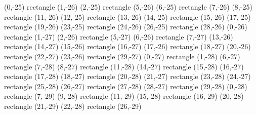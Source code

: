 {  (0,-25) rectangle (1,-26) (2,-25) rectangle (5,-26) (6,-25) rectangle (7,-26) (8,-25) rectangle (11,-26) (12,-25) rectangle (13,-26) (14,-25) rectangle (15,-26) (17,-25) rectangle (19,-26) (23,-25) rectangle (24,-26) (26,-25) rectangle (28,-26)%
  (0,-26) rectangle (1,-27) (2,-26) rectangle (5,-27) (6,-26) rectangle (7,-27) (13,-26) rectangle (14,-27) (15,-26) rectangle (16,-27) (17,-26) rectangle (18,-27) (20,-26) rectangle (22,-27) (23,-26) rectangle (29,-27)%
  (0,-27) rectangle (1,-28) (6,-27) rectangle (7,-28) (8,-27) rectangle (11,-28) (14,-27) rectangle (15,-28) (16,-27) rectangle (17,-28) (18,-27) rectangle (20,-28) (21,-27) rectangle (23,-28) (24,-27) rectangle (25,-28) (26,-27) rectangle (27,-28) (28,-27) rectangle (29,-28)%
  (0,-28) rectangle (7,-29) (9,-28) rectangle (11,-29) (15,-28) rectangle (16,-29) (20,-28) rectangle (21,-29) (22,-28) rectangle (26,-29)%
}
